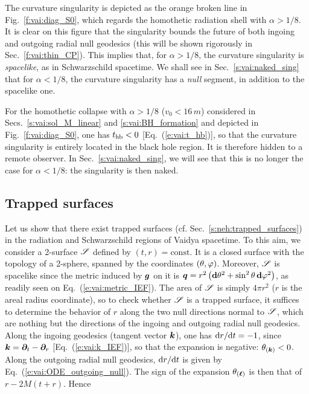 The curvature singularity is depicted as the orange broken line in Fig.~\ref{f:vai:diag_S0},
which regards the homothetic radiation shell with $\alpha > 1/8$.
It is clear on this figure that the singularity bounds the future of both ingoing and outgoing radial null geodesics (this will be shown rigorously in Sec.~\ref{f:vai:thin_CP}).
This implies that, for $\alpha > 1/8$, the curvature singularity is \emph{spacelike},
as in Schwarzschild spacetime. We shall see in Sec.~\ref{s:vai:naked_sing} that
for $\alpha < 1/8$, the curvature singularity has a \emph{null} segment, in addition to the spacelike
one.

For the homothetic collapse with $\alpha > 1/8$ ($v_0 < 16\, m$) considered in Secs.~\ref{s:vai:sol_M_linear} and
\ref{s:vai:BH_formation} and depicted in Fig.~\ref{f:vai:diag_S0}, one has $t_{\rm hb} < 0$
[Eq.~(\ref{e:vai:t_hb})], so that
the curvature singularity is entirely located in the black hole region. It is therefore hidden
to a remote observer. In Sec.~\ref{s:vai:naked_sing}, we will see that this is no longer the
case for $\alpha < 1/8$: the singularity is then naked.

\subsection{Trapped surfaces} \label{s:vai:trapped_surf}

Let us show that there exist trapped surfaces (cf. Sec.~\ref{s:neh:trapped_surfaces}) in the
radiation and Schwarzschild regions of Vaidya spacetime.
To this aim, we consider a 2-surface $\mathscr{S}$ defined by $(t,r) = \mathrm{const}$. It is a closed surface
with the topology of a 2-sphere, spanned by the coordinates $(\theta,\varphi)$.
Moreover, $\mathscr{S}$ is spacelike since the metric induced by $\bm{g}$ on it  is
$\bm{q} = r^2 \left( \mathbf{d}\theta^2 + \sin^2\theta\, \mathbf{d}\varphi^2 \right) $, as readily seen
on Eq.~(\ref{e:vai:metric_IEF}). The area of $\mathscr{S}$ is simply $4\pi r^2$
($r$ is the areal radius coordinate), so to check whether $\mathscr{S}$ is a trapped surface,
it suffices to determine the behavior
of $r$ along the two null directions normal to $\mathscr{S}$, which are nothing but
the directions of the ingoing and outgoing radial null geodesics.
Along the ingoing geodesics (tangent vector $\bm{k}$),
one has $\mathrm{d} r / \mathrm{d} t = - 1$, since $\bm{k} = \bm{\partial}_t - \bm{\partial}_r$ [Eq.~(\ref{e:vai:k_IEF})],
so that the expansion is negative: $\theta_{(\bm{k})} < 0$.
Along the outgoing radial null geodesics, $\mathrm{d} r / \mathrm{d} t$ is given by Eq.~(\ref{e:vai:ODE_outgoing_null}).
The sign of the expansion $\theta_{(\bm{\ell})}$ is then that of $r - 2M(t+r)$. Hence

